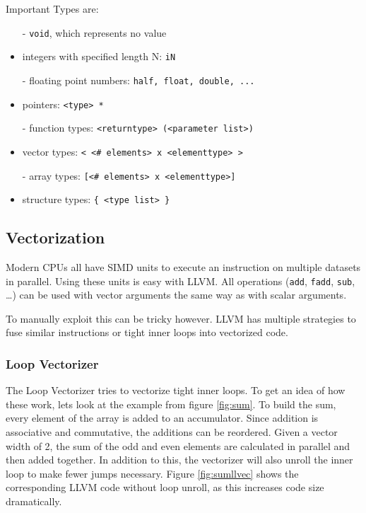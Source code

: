 \documentclass[a4paper,bibliography=totocnumbered,parskip,headsepline]{scrbook}
\begin{document}
\begin{samepage}
Important Types are:
\begin{itemize}[noitemsep]
\item[-] \lstinline{void}, which represents no value
\item[-] integers with specified length N: \lstinline[morekeywords={iN}]{iN}
\item[-] floating point numbers: \lstinline{half, float, double, ...}
\item[-] pointers: \lstinline{<type> *}
\item[-] function types: \lstinline{<returntype> (<parameter list>)}
\item[-] vector types: \lstinline{< <# elements> x <elementtype> >}
\item[-] array types: \lstinline{[<# elements> x <elementtype>]}
\item[-] structure types: \lstinline!{ <type list> }!
\end{itemize}
\end{samepage}

\subsection{Vectorization}
Modern CPUs all have SIMD units to execute an instruction on multiple datasets in parallel.
Using these units is easy with LLVM.
All operations (\lstinline{add}, \lstinline{fadd}, \lstinline{sub}, \dots) can be used with vector arguments the same way as with scalar arguments.

To manually exploit this can be tricky however.
LLVM has multiple strategies to fuse similar instructions or tight inner loops into vectorized code.\cite{llvmauto}

\subsubsection{Loop Vectorizer}
The Loop Vectorizer tries to vectorize tight inner loops.
To get an idea of how these work, lets look at the example from figure \ref{fig:sum}.
To build the sum, every element of the array is added to an accumulator.
Since addition is associative and commutative, the additions can be reordered.
Given a vector width of 2, the sum of the odd and even elements are calculated in parallel and then added together.
In addition to this, the vectorizer will also unroll the inner loop to make fewer jumps necessary.
Figure \ref{fig:sumllvec} shows the corresponding LLVM code without loop unroll, as this increases code size dramatically.
\end{document}
